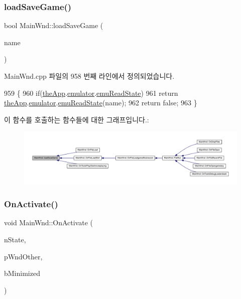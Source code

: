 \subsubsection{\texorpdfstring{load\+Save\+Game()}{loadSaveGame()}}
{\footnotesize\ttfamily bool Main\+Wnd\+::load\+Save\+Game (\begin{DoxyParamCaption}\item[{\mbox{\hyperlink{getopt1_8c_a2c212835823e3c54a8ab6d95c652660e}{const}} char $\ast$}]{name }\end{DoxyParamCaption})}



Main\+Wnd.\+cpp 파일의 958 번째 라인에서 정의되었습니다.


\begin{DoxyCode}
959 \{
960   \textcolor{keywordflow}{if}(\mbox{\hyperlink{_v_b_a_8cpp_a8095a9d06b37a7efe3723f3218ad8fb3}{theApp}}.\mbox{\hyperlink{class_v_b_a_ab40fc008c6714c3c8670eb8a9085a4a1}{emulator}}.\mbox{\hyperlink{struct_emulated_system_a1ad8780083ad23c2cbe474fc570745ea}{emuReadState}})
961     \textcolor{keywordflow}{return} \mbox{\hyperlink{_v_b_a_8cpp_a8095a9d06b37a7efe3723f3218ad8fb3}{theApp}}.\mbox{\hyperlink{class_v_b_a_ab40fc008c6714c3c8670eb8a9085a4a1}{emulator}}.\mbox{\hyperlink{struct_emulated_system_a1ad8780083ad23c2cbe474fc570745ea}{emuReadState}}(name);
962   \textcolor{keywordflow}{return} \textcolor{keyword}{false};
963 \}
\end{DoxyCode}
이 함수를 호출하는 함수들에 대한 그래프입니다.\+:
\nopagebreak
\begin{figure}[H]
\begin{center}
\leavevmode
\includegraphics[width=350pt]{class_main_wnd_ae53f005e124fddf8681dc9a31992841f_icgraph}
\end{center}
\end{figure}
\mbox{\label{class_main_wnd_a13b06fced945b76eb11328fb66f70123}} 
\subsubsection{\texorpdfstring{On\+Activate()}{OnActivate()}}
{\footnotesize\ttfamily void Main\+Wnd\+::\+On\+Activate (\begin{DoxyParamCaption}\item[{U\+I\+NT}]{n\+State,  }\item[{C\+Wnd $\ast$}]{p\+Wnd\+Other,  }\item[{B\+O\+OL}]{b\+Minimized }\end{DoxyParamCaption})\hspace{0.3cm}{\ttfamily [protected]}}



